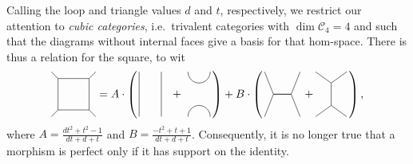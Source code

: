 \bigno Calling the loop and triangle values $d$ and $t$, respectively, we restrict our attention to \emph{cubic categories}, i.e.\ trivalent categories with $\dim \mathcal{C}_4=4$ and such that the diagrams without internal faces give a basis for that hom-space. There is thus a relation for the square, to wit
\begin{align*}
\begin{tikzpicture}[scale = 0.7, baseline=-1mm]
	\draw (-1,1)  -- (-0.7,0.7) -- (0.7,0.7) -- (1,1);
	\draw (-1,-1)  -- (-0.7,-0.7) -- (0.7,-0.7) -- (1,-1);	
	\draw (-0.7,0.7) -- (-0.7,-0.7);
	\draw (0.7,0.7) -- (0.7,-0.7);	
\end{tikzpicture}
=
A\cdot \left( \,
	\begin{tikzpicture}[scale=0.7, baseline=-1mm]
		\begin{scope}
			\foreach \x in {0, 1} \draw (\x, -1) -- (\x, 1);
		\end{scope}
		\begin{scope}[shift={(2.2,0)}]
			\node (beta) at (-0.5,0) {$+$};
			\draw (0,1) arc[start angle=180, end angle=360, radius=5mm];
			\draw (0,-1) arc[start angle=180, end angle=0, radius=5mm];
		\end{scope}
	\end{tikzpicture}
\, \right)
+ B\cdot \left( \,
	\begin{tikzpicture}[scale=0.7, baseline=-1mm]
		\begin{scope}[shift={(0,0)}]
			\draw (-0.8,1) -- (-0.4, 0) -- (0.4,0) -- (0.8,1);
			\draw (-0.8,-1) -- (-0.4, 0) -- (0.4,0) -- (0.8,-1);
		\end{scope}
		\begin{scope}[shift={(2.2,0)}]
			\node (delta) at (-1,0) {$+$};
			\draw (0.7, 1) -- (0, 0.5) -- (-0.7, 1);
			\draw (0.7, -1) -- (0, -0.5) -- (-0.7, -1);
			\draw (0, 0.5) -- (0, -0.5);
		\end{scope}
	\end{tikzpicture}
	\, \right),
\end{align*}
where $A = \frac{d t^2 + t^2 -1}{dt + d +t}$ and $B = \frac{-t^2 + t+1}{dt + d +t}$. 
Consequently, it is no longer true that a morphism is perfect only if it has support on the identity.

